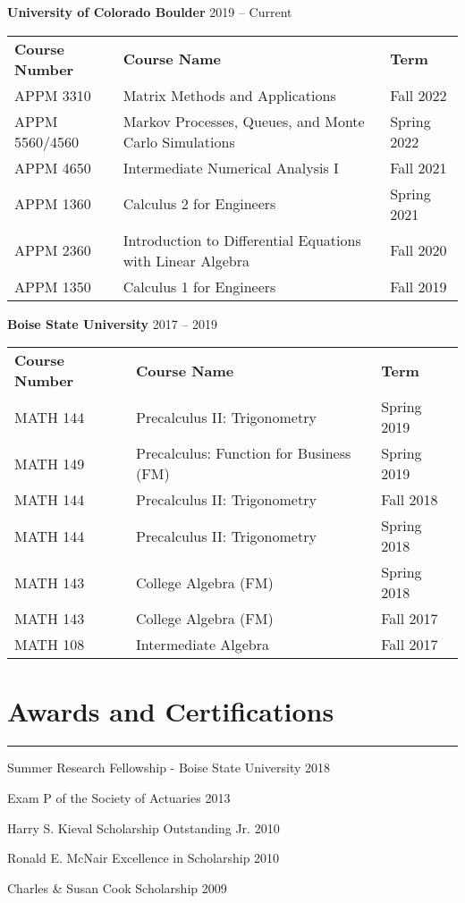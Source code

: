 \documentclass[a4paper,11pt]{article}
\newcommand{\sectitle}[1]{
    \vspace{1.5ex}
    \section{#1}
    \vspace{-3ex}
    \noindent\rule{\textwidth}{0.7pt}
    \vspace{-4ex}
}
\begin{document}
\textbf{University of Colorado Boulder} \hfill{2019 -- Current}

\begin{tabular}{l l l}
	\textbf{Course Number} & \textbf{Course Name} & \textbf{Term} \\
	APPM 3310 & Matrix Methods and Applications & Fall 2022 \\
	APPM 5560/4560 & Markov Processes, Queues, and Monte Carlo Simulations & Spring 2022 \\
	APPM 4650 & Intermediate Numerical Analysis I & Fall 2021 \\
	APPM 1360 & Calculus 2 for Engineers & Spring 2021 \\
	APPM 2360 & Introduction to Differential Equations with Linear Algebra & Fall 2020 \\
	APPM 1350 & Calculus 1 for Engineers & Fall 2019
\end{tabular}

\textbf{Boise State University} \hfill{2017 -- 2019}

\begin{tabular}{l l l}
	\textbf{Course Number} & \textbf{Course Name} & \textbf{Term} \\
	MATH 144 & Precalculus II: Trigonometry & Spring 2019 \\
	MATH 149 & Precalculus: Function for Business (FM) & Spring 2019 \\
	MATH 144 & Precalculus II: Trigonometry & Fall 2018 \\
	MATH 144 & Precalculus II: Trigonometry & Spring 2018 \\
	MATH 143 & College Algebra (FM) & Spring 2018 \\
	MATH 143 & College Algebra (FM) & Fall 2017 \\
	MATH 108 & Intermediate Algebra & Fall 2017 \\
\end{tabular}

\sectitle{Awards and Certifications}

Summer Research Fellowship - Boise State University 2018

Exam P of the Society of Actuaries 2013

Harry S. Kieval Scholarship Outstanding Jr. 2010

Ronald E. McNair Excellence in Scholarship 2010

Charles \& Susan Cook Scholarship 2009
\end{document}
